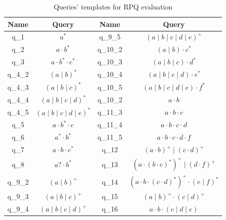 \begin{table}
{\small
\begin{tabular}{|c|c||c|c|}
\hline

Name & Query & Name & Query \\
\hline
\hline 
q\_1    & $a^*$                               & q\_9\_5  & $(a \mid b \mid c \mid d \mid e)^+$                     \\
q\_2    & $a\cdot b^*$                        & q\_10\_2 & $(a \mid b) \cdot c^*$                                  \\
q\_3    & $a \cdot b^* \cdot c^*$             & q\_10\_3 & $(a \mid b \mid c)  \cdot d^*$                          \\
q\_4\_2 & $(a \mid b)^*$                      & q\_10\_4 & $(a \mid b \mid c \mid d)  \cdot e^*$                   \\
q\_4\_3 & $(a \mid b \mid c)^*$               & q\_10\_5 & $(a \mid b \mid c \mid d \mid e)  \cdot f^*$            \\
q\_4\_4 & $(a \mid b \mid c \mid d)^*$        & q\_10\_2 & $a \cdot b$                                             \\
q\_4\_5 & $(a \mid b \mid c \mid d \mid e)^*$ & q\_11\_3 & $a \cdot b \cdot c$                                     \\
q\_5    & $a \cdot b^* \cdot c$               & q\_11\_4 & $a \cdot b \cdot c \cdot d$                             \\
q\_6    & $a^* \cdot b^*$                     & q\_11\_5 & $a \cdot b \cdot c \cdot d \cdot f$                     \\
q\_7    & $a \cdot b \cdot c^*$               & q\_12    & $(a \cdot b)^+ \mid  (c \cdot d)^+$                     \\
q\_8    & $a? \cdot b^*$                      & q\_13    & $(a \cdot(b \cdot c)^*)^+ \mid  (d \cdot f)^+$          \\
q\_9\_2 & $(a \mid b)^+$                      & q\_14    & $(a \cdot b \cdot (c \cdot d)^*)^+  \cdot (e \mid f)^*$ \\
q\_9\_3 & $(a \mid b \mid c)^+$               & q\_15    & $(a \mid b)^+ \cdot (c \mid d)^+$                       \\
q\_9\_4 & $(a \mid b \mid c \mid d)^+$        & q\_16    & $a \cdot b \cdot (c \mid d \mid e)$                     \\
\hline
\end{tabular}
}
\caption{Queries' templates for RPQ evaluation}
\label{tbl:queries_templates}
\end{table}


